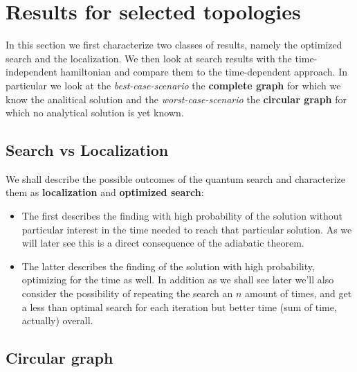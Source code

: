 \documentclass[aps,pra,reprint, onecolumn]{revtex4-2}
\begin{document}
\section{Results for selected topologies}
In this section we first characterize two classes of results, namely the optimized search and the localization. We then look at search results with the time-independent hamiltonian and compare them to the time-dependent approach. In particular we look at the \textit{best-case-scenario} the \textbf{complete graph} for which we know the analitical solution and the \textit{worst-case-scenario} the \textbf{circular graph} for which no analytical solution is yet known. 


\subsection{Search vs Localization}
We shall describe the possible outcomes of the quantum search and characterize them as \textbf{localization} and \textbf{optimized search}:
\begin{itemize}
\item The first describes the finding with high probability of the solution without particular interest in the time needed to reach that particular solution. As we will later see this is a direct consequence of the adiabatic theorem. 

\item The latter describes the finding of the solution with high probability, optimizing for the time as well. In addition as we shall see later we'll also consider the possibility of repeating the search an $n$ amount of times, and get a less than optimal search for each iteration but better time (sum of time, actually) overall.
\end{itemize}

\subsection{Circular graph}
\end{document}
